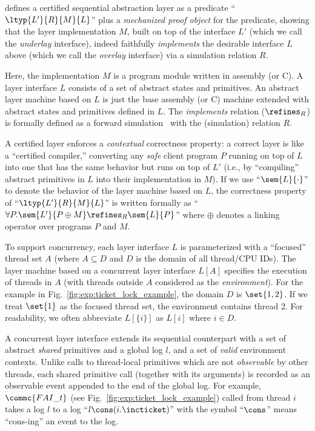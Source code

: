 \citet{deepspec} defines
a certified sequential abstraction layer 
as a predicate 
``$\ltyp{L'}{R}{M}{L}$'' plus a \emph{mechanized proof object} for the predicate,
showing that the layer implementation $M$, built
on top of the interface $L'$ (which we call the {\em underlay}
interface), indeed faithfully {\em implements} the desirable interface
$L$ above (which we call the {\em overlay} interface) via a simulation
relation $R$.

Here, the implementation $M$ is a program module written in
assembly (or C). A layer interface $L$ consists of a set of abstract
states and primitives. An abstract layer machine based on $L$ is just
the base assembly (or C) machine extended with abstract states and
primitives defined in $L$.  The {\em implements} relation
($\refines_R$) is formally defined as a forward
simulation~\cite{Lynch95,leroy09,Milner71,Park81} with the
(simulation) relation $R$.

A certified layer enforces a {\em contextual} correctness property: a
correct layer is like a ``certified compiler,'' converting any {\em
  safe} client program $P$ running on top of $L$ into one that has the
same behavior but runs on top of $L'$ (i.e., by ``compiling'' abstract
primitives in $L$ into their implementation in $M$).  If we use
``$\sem{L}{\cdot}$'' to denote the behavior of the layer machine based on
$L$, the correctness property of ``$\ltyp{L'}{R}{M}{L}$'' is written
formally as ``$\forall{}P.\sem{L'}{P\oplus{}M} \refines_R \sem{L}{P}$''
where $\oplus$ denotes a linking operator over programs $P$ and $M$.




To support concurrency, each layer interface $L$ is parameterized
with a ``focused'' thread set $A$ (where $A \subseteq D$ and $D$ is
the domain of all thread/CPU IDs).  The layer machine
based on a concurrent layer interface $L[A]$ specifies
the execution of threads in $A$ (with threads
outside $A$ considered as the {\em environment}). For the example in Fig.~\ref{fig:exp:ticket_lock_example}, the domain $D$ is $\set{1, 2}$. If we treat $\set{1}$ as the focused thread set, the environment contains thread 2.
For readability,
we often abbreviate $L[\{i\}]$ as $L[i]$ where $i\in{}D$.

A concurrent layer interface extends its sequential counterpart
 with a
set of abstract {\em shared} primitives and a global log $l$, and a set of {\em valid} environment contexts.
Unlike calls to thread-local primitives
which are not {\em observable} by other threads, each shared primitive call (together with its arguments) is recorded as an
observable event appended to the end of the global log. 
For example, $\commc{FAI\_t}$ (see Fig.~\ref{fig:exp:ticket_lock_example}) called from thread
$i$ takes a log $l$ to a log ``$l \cons (i.\incticket)$'' with the symbol
``$\cons$'' means ``cons-ing'' an event to the log. 

